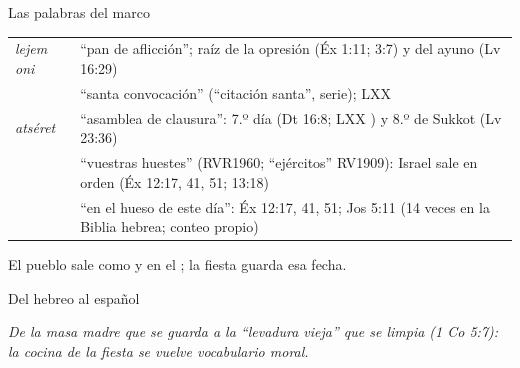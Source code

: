 \begin{frame}{Las palabras del marco}
\scriptsize\renewcommand{\arraystretch}{1.15}
\begin{tabular}{@{}L{2.7cm}L{9.3cm}@{}}
\toprule
{} \emph{lejem oni} & ``pan de aflicción''; raíz de la opresión (Éx 1:11; 3:7) y del ayuno (Lv 16:29) \\
 & ``santa convocación'' (``citación santa'', serie); LXX  \\
 \emph{atséret} & ``asamblea de clausura'': 7.º día (Dt 16:8; LXX ) y 8.º de Sukkot (Lv 23:36) \\
 & ``vuestras huestes'' (RVR1960; ``ejércitos'' RV1909): Israel sale en orden (Éx 12:17, 41, 51; 13:18) \\
 & ``en el hueso de este día'': Éx 12:17, 41, 51; Jos 5:11 (14 veces en la Biblia hebrea; conteo propio) \\
\bottomrule
\end{tabular}\par\medskip
\small El pueblo sale como  y en el ; la fiesta guarda esa fecha.
\end{frame}

\begin{frame}{Del hebreo al español}
\centering
{}\par\medskip
\small\itshape\color{sepia} De la masa madre que se guarda a la ``levadura vieja'' que se limpia (1 Co 5:7): la cocina de la fiesta se vuelve vocabulario moral.
\end{frame}

